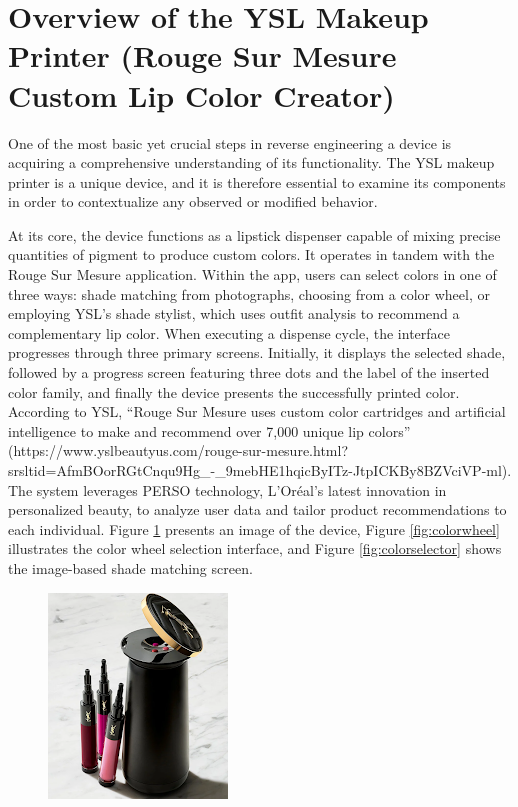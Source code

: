\section{Overview of the YSL Makeup Printer (Rouge Sur Mesure Custom Lip Color Creator)}
One of the most basic yet crucial steps in reverse engineering a device is acquiring a comprehensive understanding of its functionality. The YSL makeup printer is a unique device, and it is therefore essential to examine its components in order to contextualize any observed or modified behavior.

At its core, the device functions as a lipstick dispenser capable of mixing precise quantities of pigment to produce custom colors. It operates in tandem with the Rouge Sur Mesure application. Within the app, users can select colors in one of three ways: shade matching from photographs, choosing from a color wheel, or employing YSL’s shade stylist, which uses outfit analysis to recommend a complementary lip color. When executing a dispense cycle, the interface progresses through three primary screens. Initially, it displays the selected shade, followed by a progress screen featuring three dots and the label of the inserted color family, and finally the device presents the successfully printed color. According to YSL, “Rouge Sur Mesure uses custom color cartridges and artificial intelligence to make and recommend over 7,000 unique lip colors” (https://www.yslbeautyus.com/rouge-sur-mesure.html?srsltid=AfmBOorRGtCnqu9Hg\_-\_9mebHE1hqicByITz-JtpICKBy8BZVciVP-ml). The system leverages PERSO technology, L’Oréal’s latest innovation in personalized beauty, to analyze user data and tailor product recommendations to each individual. Figure \ref*{fig:makeupprinter} presents an image of the device, Figure \ref{fig:colorwheel} illustrates the color wheel selection interface, and Figure \ref{fig:colorselector} shows the image-based shade matching screen.
\begin{figure}[H]
	\centering
	\includegraphics[scale=1.1]{makeupprinter}
	\caption{}
	\label{fig:makeupprinter}
\end{figure}

